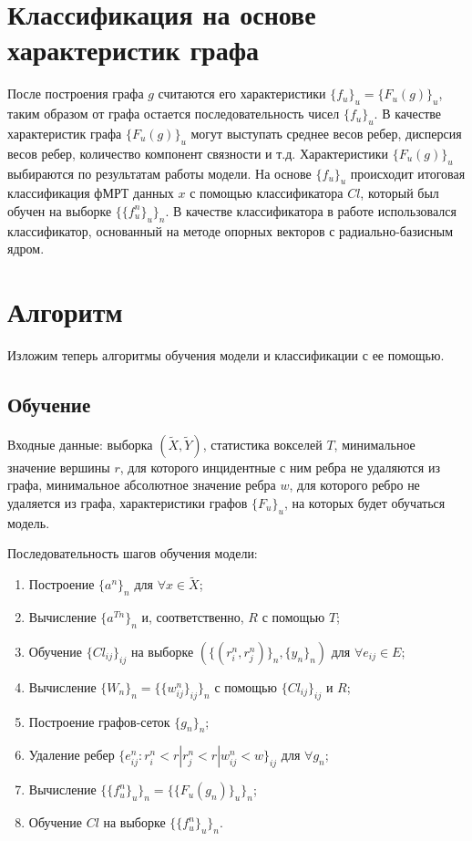 \documentclass[specialist,
substylefile = spbu_report.rtx,
subf,href,colorlinks=true, 12pt]{disser}
\begin{document}
		\section{Классификация на основе характеристик графа}
			После построения графа $g$ считаются его характеристики $\{f_u\}_u = \{F_u(g)\}_u$, таким образом от графа остается последовательность чисел $\{f_u\}_u$. В качестве характеристик графа $\{F_u(g)\}_u$ могут выступать среднее весов ребер, дисперсия весов ребер, количество компонент связности и т.д. Характеристики $\{F_u(g)\}_u$ выбираются по результатам работы модели. На основе $\{f_u\}_u$ происходит итоговая классификация фМРТ данных $x$ с помощью классификатора $Cl$, который был обучен на выборке $\{\{f_u^n\}_u\}_n$. В качестве классификатора в работе использовался классификатор, основанный на методе опорных векторов с радиально-базисным ядром.
			
		\section{Алгоритм}
			Изложим теперь алгоритмы обучения модели и классификации с ее помощью. 
						
			\subsection{Обучение}
				Входные данные: выборка $(\widetilde{X}, \widetilde{Y})$, статистика вокселей $T$, минимальное значение вершины $r$, для которого инцидентные с ним ребра не удаляются из графа, минимальное абсолютное значение ребра $w$, для которого ребро не удаляется из графа, характеристики графов $\{F_u\}_u$, на которых будет обучаться модель.			
				
				Последовательность шагов обучения модели:
				\begin{enumerate}
					\item Построение $\{a^n\}_n$ для $\forall x \in \widetilde{X}$;
					\item Вычисление $\{a^{Tn}\}_n$ и, соответственно, $R$ с помощью $T$;
					\item Обучение  $\{Cl_{ij}\}_{ij}$ на выборке $(\{(r_i^n, r_j^n)\}_n, \{y_n\}_n)$ для $\forall e_{ij} \in E$;
					\item Вычисление $\{W_n\}_n = \{\{w_{ij}^n\}_{ij}\}_n$ с помощью $\{Cl_{ij}\}_{ij}$ и $R$;
					\item Построение графов-сеток $\{g_n\}_n$;
					\item Удаление ребер $\{e_{ij}^n : r_i^n < r | r_j^n < r | w_{ij}^n < w\}_{ij}$  для $\forall g_n$;
					\item Вычисление $\{\{f^n_u\}_u\}_n = \{\{F_u(g_n)\}_u\}_n$;
					\item Обучение $Cl$ на выборке $\{\{f^n_u\}_u\}_n$.
				\end{enumerate}
			
\end{document}
